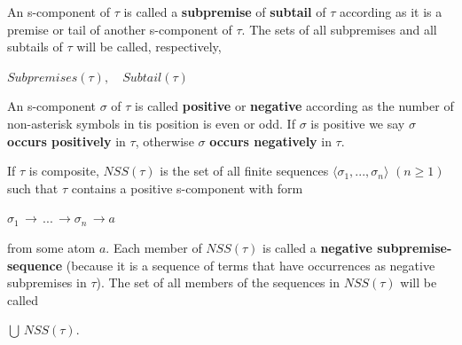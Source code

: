 \documentclass[a4paper,10pt]{article}
\begin{document}
\begin{mydef} An s-component of $\tau$ is called a \textbf{subpremise} of \textbf{subtail} of $\tau$ according as it is a premise or tail of another
s-component of $\tau$. The sets of all subpremises and all subtails of $\tau$ will be called, respectively,
\begin{center}
 $Subpremises(\tau),\,\,\,\,\,\,Subtail(\tau)$
\end{center}
\end{mydef}

\begin{mydef} An s-component $\sigma$ of $\tau$ is called \textbf{positive} or \textbf{negative} according as the number of 
 non-asterisk symbols in tis position is even or odd. If $\sigma$ is positive we say $\sigma$ \textbf{occurs positively} in $\tau$, otherwise $\sigma$ 
 \textbf{occurs negatively} in $\tau$.
\end{mydef}
 
\begin{mydef} If $\tau$ is composite, $NSS(\tau)$ is the set of all finite sequences $\langle\sigma_1, ..., \sigma_n\rangle\,\,(n\geq 1)$ such
 that $\tau$ contains a positive s-component with form
\begin{center}
 $\sigma_1\,\to\,...\,\to\sigma_n\,\to a$
\end{center}
from some atom $a$. Each member of $NSS(\tau)$ is called a \textbf{negative subpremise-sequence} (because it is a sequence of terms that have occurrences as negative
subpremises in $\tau$).
The set of all members of the sequences in $NSS(\tau)$ will be called
\begin{center}
 $\bigcup\, NSS(\tau)$.
\end{center}
\end{mydef}
\end{document}
